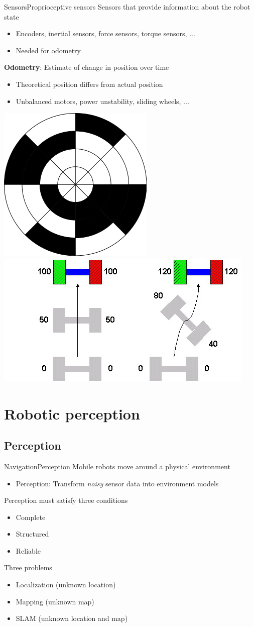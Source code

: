 \documentclass[10pt,compress]{beamer} %
\begin{document}
\begin{frame}{Sensors}{Proprioceptive sensors}
	Sensors that provide information about the robot state
	\begin{itemize}
		\item Encoders, inertial sensors, force sensors, torque sensors, ...
		\item Needed for \alert{odometry}
	\end{itemize}
	\textbf{Odometry}: Estimate of change in position over time
	\begin{itemize}
		\item Theoretical position differs from actual position
		\item Unbalanced motors, power unstability, sliding wheels, ...
	\end{itemize}
	\begin{center}
	\includegraphics[width=0.2\linewidth]{figs/encoder.png}\quad
	\includegraphics[width=0.4\linewidth]{figs/odometry.jpg}
	\end{center}
\end{frame}

\section{Robotic perception}
\subsection{Perception}
\begin{frame}{Navigation}{Perception}
	Mobile robots move around a physical environment
	\begin{itemize}
		\item Perception: Transform \textit{noisy} sensor data into environment models
	\end{itemize}
	Perception must satisfy three conditions
	\begin{itemize}
		\item Complete 
		\item Structured
		\item Reliable
	\end{itemize}
	Three problems
	\begin{itemize}
		\item Localization (unknown location)
		\item Mapping (unknown map)
		\item SLAM (unknown location and map)
	\end{itemize}
\end{frame}
\end{document}
